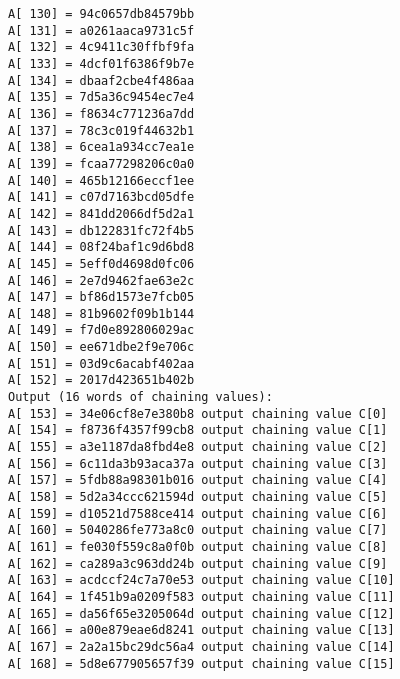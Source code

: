 \begin{verbatim}
A[ 130] = 94c0657db84579bb
A[ 131] = a0261aaca9731c5f
A[ 132] = 4c9411c30ffbf9fa
A[ 133] = 4dcf01f6386f9b7e
A[ 134] = dbaaf2cbe4f486aa
A[ 135] = 7d5a36c9454ec7e4
A[ 136] = f8634c771236a7dd
A[ 137] = 78c3c019f44632b1
A[ 138] = 6cea1a934cc7ea1e
A[ 139] = fcaa77298206c0a0
A[ 140] = 465b12166eccf1ee
A[ 141] = c07d7163bcd05dfe
A[ 142] = 841dd2066df5d2a1
A[ 143] = db122831fc72f4b5
A[ 144] = 08f24baf1c9d6bd8
A[ 145] = 5eff0d4698d0fc06
A[ 146] = 2e7d9462fae63e2c
A[ 147] = bf86d1573e7fcb05
A[ 148] = 81b9602f09b1b144
A[ 149] = f7d0e892806029ac
A[ 150] = ee671dbe2f9e706c
A[ 151] = 03d9c6acabf402aa
A[ 152] = 2017d423651b402b
Output (16 words of chaining values):
A[ 153] = 34e06cf8e7e380b8 output chaining value C[0]
A[ 154] = f8736f4357f99cb8 output chaining value C[1]
A[ 155] = a3e1187da8fbd4e8 output chaining value C[2]
A[ 156] = 6c11da3b93aca37a output chaining value C[3]
A[ 157] = 5fdb88a98301b016 output chaining value C[4]
A[ 158] = 5d2a34ccc621594d output chaining value C[5]
A[ 159] = d10521d7588ce414 output chaining value C[6]
A[ 160] = 5040286fe773a8c0 output chaining value C[7]
A[ 161] = fe030f559c8a0f0b output chaining value C[8]
A[ 162] = ca289a3c963dd24b output chaining value C[9]
A[ 163] = acdccf24c7a70e53 output chaining value C[10]
A[ 164] = 1f451b9a0209f583 output chaining value C[11]
A[ 165] = da56f65e3205064d output chaining value C[12]
A[ 166] = a00e879eae6d8241 output chaining value C[13]
A[ 167] = 2a2a15bc29dc56a4 output chaining value C[14]
A[ 168] = 5d8e677905657f39 output chaining value C[15]


\end{verbatim}
